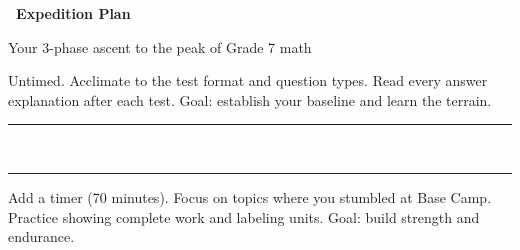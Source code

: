 
\thispagestyle{empty}

{
\sffamily

\begin{center}
    \textcolor{alpSlate}{\fontsize{26}{30}\selectfont\bfseries
    \faRoute~Expedition Plan~\faRoute}

    \smallskip
    \textcolor{alpRock}{\normalsize Your 3-phase ascent to the peak of Grade 7 math}
\end{center}

\vspace{2mm}

\noindent
\begin{tcolorbox}[
    enhanced,
    colback=alpPine!5,
    colframe=alpPine!45,
    arc=4pt, boxrule=1.5pt,
    left=5mm, right=5mm, top=3mm, bottom=3mm,
    title={\textcolor{white}{Base Camp (Tests 1--3)}},
    colbacktitle=alpPine!70,
    fonttitle=\bfseries\sffamily,
    borderline west={3pt}{0pt}{alpPine!55},
]
    \small
    Untimed. Acclimate to the test format and question types.
    Read every answer explanation after each test.
    Goal: establish your baseline and learn the terrain.
\end{tcolorbox}

\vspace{1mm}
\begin{center}
    \textcolor{alpPine!30}{\rule{0.3\linewidth}{0.4pt}}
    \textcolor{alpPine!50}{~\faAngleDoubleUp~}
    \textcolor{alpPine!30}{\rule{0.3\linewidth}{0.4pt}}
\end{center}
\vspace{1mm}

\noindent
\begin{tcolorbox}[
    enhanced,
    colback=alpSunrise!6,
    colframe=alpSunrise!50,
    arc=4pt, boxrule=1.5pt,
    left=5mm, right=5mm, top=3mm, bottom=3mm,
    title={\textcolor{white}{The Ridge (Tests 4--6)}},
    colbacktitle=alpSunrise!75,
    fonttitle=\bfseries\sffamily,
    borderline west={3pt}{0pt}{alpSunrise!60},
]
    \small
    Add a timer (70 minutes). Focus on topics where you stumbled
    at Base Camp. Practice showing complete work and labeling
    units. Goal: build strength and endurance.
\end{tcolorbox}

}
